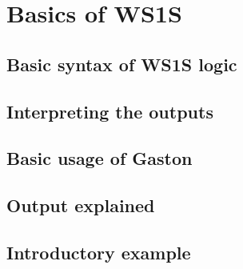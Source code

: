  
\chapter{Basics of WS1S}
\begin{intro}

\end{intro}

\section{Basic syntax of WS1S logic}

\section{Interpreting the outputs}

\section{Basic usage of Gaston}

\section{Output explained}

\section{Introductory example}
 
%

